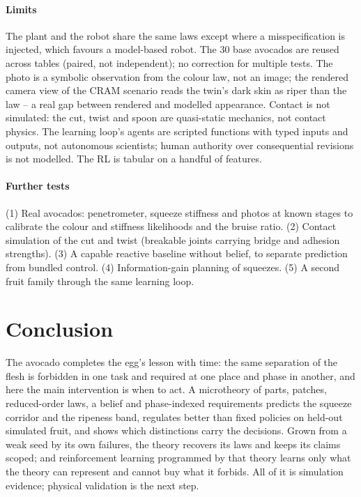 \documentclass[10.5pt,a4paper]{article}
\begin{document}
\paragraph{Limits} The plant and the robot share the same laws except where a misspecification is injected, which
favours a model-based robot. The 30 base avocados are reused across tables (paired, not independent); no correction
for multiple tests. The photo is a symbolic observation from the colour law, not an image; the rendered camera view
of the CRAM scenario reads the twin's dark skin as riper than the law -- a real gap between rendered and modelled
appearance. Contact is not simulated: the cut, twist and spoon are quasi-static mechanics, not contact physics. The
learning loop's agents are scripted functions with typed inputs and outputs, not autonomous scientists; human
authority over consequential revisions is not modelled. The RL is tabular on a handful of features.

\paragraph{Further tests} (1) Real avocados: penetrometer, squeeze stiffness and photos at known stages to calibrate the
colour and stiffness likelihoods and the bruise ratio. (2) Contact simulation of the cut and twist (breakable joints
carrying bridge and adhesion strengths). (3) A capable reactive baseline without belief, to separate prediction from
bundled control. (4) Information-gain planning of squeezes. (5) A second fruit family through the same learning loop.
\section{Conclusion}
The avocado completes the egg's lesson with time: the same separation of the flesh is forbidden in one task and
required at one place and phase in another, and here the main intervention is when to act. A microtheory of parts,
patches, reduced-order laws, a belief and phase-indexed requirements predicts the squeeze corridor and the ripeness
band, regulates better than fixed policies on held-out simulated fruit, and shows which distinctions carry the
decisions. Grown from a weak seed by its own failures, the theory recovers its laws and keeps its claims scoped; and
reinforcement learning programmed by that theory learns only what the theory can represent and cannot buy what it
forbids. All of it is simulation evidence; physical validation is the next step.
\end{document}
